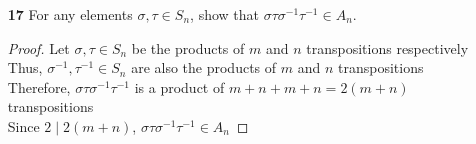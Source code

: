 \documentclass[paper=usletter, fontsize=12pt]{article}
\begin{document}
\begin{itemize}
\begin{itemize}
\begin{proof}
                Which forms the set
                \begin{align*}
                    \gl_2(\mathbb{C}) & = \{e,a,a^2,a^3,b,ab,a^2b,a^3b\}, \text{ with } a^4=b^2=e, \ ba=a^{-1}b\\
                    & \cong D_4 \qedhere
                \end{align*}

            \end{proof}







            \item[\textbf{17}] For any elements $\sigma, \tau \in S_n$, show
            that $\sigma\tau\sigma^{-1}\tau^{-1}\in A_n$.
            \begin{proof}

                Let $\sigma,\tau \in S_n$ be the products of $m$ and $n$
                transpositions respectively\\
                Thus, $\sigma^{-1},\tau^{-1} \in S_n$ are also the products of
                $m$ and $n$ transpositions\\
                Therefore, $\sigma\tau\sigma^{-1}\tau^{-1}$ is a product of
                $m+n+m+n=2(m+n)$ transpositions\\
                Since $2 \mid 2(m+n)$, $\sigma\tau\sigma^{-1}\tau^{-1} \in A_n$
                \qedhere


\end{proof}
\end{itemize}
\end{itemize}
\end{document}

